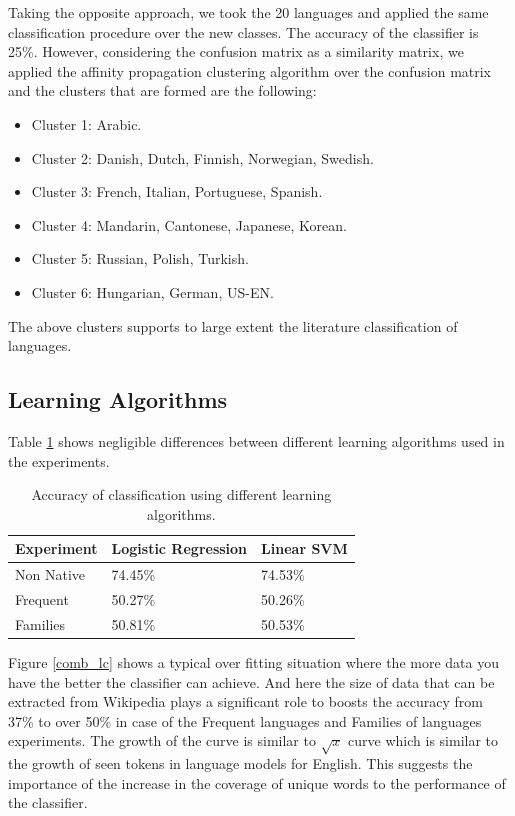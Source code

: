 \documentclass[11pt]{article}
\begin{document}
Taking the opposite approach, we took the 20 languages and applied the same classification procedure over the new classes. The accuracy of the classifier is 25\%. However, considering the confusion matrix as a similarity matrix, we applied the affinity propagation clustering algorithm over the confusion matrix and the clusters that are formed are the following:
\begin{itemize}
\item Cluster 1: Arabic.
\item Cluster 2: Danish, Dutch, Finnish, Norwegian, Swedish.
\item Cluster 3: French, Italian, Portuguese, Spanish.
\item Cluster 4: Mandarin, Cantonese, Japanese, Korean.
\item Cluster 5: Russian, Polish, Turkish.
\item Cluster 6: Hungarian, German, US-EN.
\end{itemize}

The above clusters supports to large extent the literature classification of languages.

\subsection{Learning Algorithms}

Table \ref{table:results} shows negligible differences between different learning algorithms used in the experiments. 

\begin{table}[htp]
\begin{tabular}{l|ll}
	Experiment & Logistic Regression & Linear SVM
	\\\hline
	Non Native & 74.45\% & 74.53\%\\
	Frequent & 50.27\% & 50.26\%\\
	Families & 50.81\% &50.53\% \\
\end{tabular}
\caption{Accuracy of classification using different learning algorithms.}
\label{table:results}
\end{table}

Figure \ref{comb_lc} shows a typical over fitting situation where the more data you have the better the classifier can achieve. And here the size of data that can be extracted from Wikipedia plays a significant role to boosts the accuracy from 37\% to over 50\% in case of the Frequent languages and Families of languages experiments. The growth of the curve is similar to $\sqrt{x}$ curve which is similar to the growth of seen tokens in language models for English. This suggests the importance of the increase in the coverage of unique words to the performance of the classifier.
\end{document}
